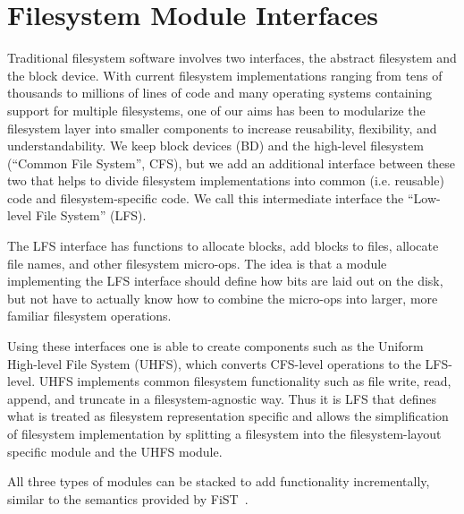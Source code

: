 \section{Filesystem Module Interfaces}
\label{sec:interfaces}

Traditional filesystem software involves two interfaces, the abstract filesystem
and the block device. With current filesystem implementations ranging from tens
of thousands to millions of lines of code and many operating systems containing
support for multiple filesystems, one of our aims has been to modularize the
filesystem layer into smaller components to increase reusability, flexibility,
and understandability. We keep block devices (BD) and the high-level filesystem
(``Common File System'', CFS), but we add an additional interface between these
two that helps to divide filesystem implementations into common (i.e. reusable)
code and filesystem-specific code. We call this intermediate interface the
``Low-level File System'' (LFS).

The LFS interface has functions to allocate blocks, add blocks to files,
allocate file names, and other filesystem micro-ops. The idea is that a module
implementing the LFS interface should define how bits are laid out on the disk,
but not have to actually know how to combine the micro-ops into larger, more
familiar filesystem operations.

Using these interfaces one is able to create components such as the Uniform
High-level File System (UHFS), which converts CFS-level operations to the
LFS-level. UHFS implements common filesystem functionality such as file write,
read, append, and truncate in a filesystem-agnostic way. Thus it is LFS that
defines what is treated as filesystem representation specific and allows the
simplification of filesystem implementation by splitting a filesystem into the
filesystem-layout specific module and the UHFS module.

All three types of modules can be stacked to add functionality incrementally,
similar to the semantics provided by FiST~\cite{zadok00fist}.
